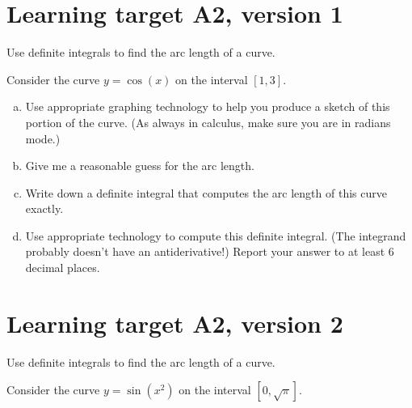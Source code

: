




\everymath{\displaystyle}

\section{Learning target A2, version 1}

Use definite integrals to find the arc length of a curve.

\hrulefill

Consider the curve \(y = \cos(x)\) on the interval \([1,3]\).

\begin{enumerate}[(a)]
	\item Use appropriate graphing technology to help you produce a sketch of this portion of the curve. (As always in calculus, make sure you are in radians mode.) 

	\vfill
	\vfill
	
	\item Give me a reasonable guess for the arc length.

	\vfill

	\item Write down a definite integral that computes the arc length of this curve exactly.

	\vfill
	
	\item Use appropriate technology to compute this definite integral. (The integrand probably doesn't have an antiderivative!) Report your answer to at least 6 decimal places. 
	\vfill
\end{enumerate}

\pagebreak

\section{Learning target A2, version 2}

Use definite integrals to find the arc length of a curve.

\hrulefill

Consider the curve \(y = \sin(x^2)\) on the interval \([0,\sqrt{\pi}]\).

